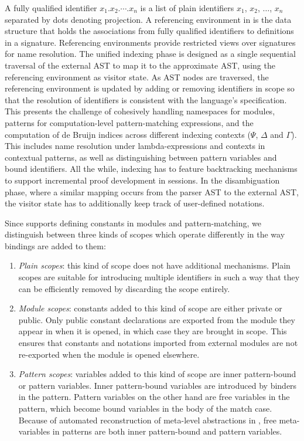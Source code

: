 A fully qualified identifier $x_1.x_2.\cdots.x_n$ is a list of plain identifiers $x_1$, $x_2$, $\dots$, $x_n$ separated by dots denoting projection.
A referencing environment in \Beluga is the data structure that holds the associations from fully qualified identifiers to definitions in a signature.
Referencing environments provide restricted views over signatures for name resolution.
The unified indexing phase is designed as a single sequential traversal of the external \ac{AST} to map it to the approximate \ac{AST}, using the referencing environment as visitor state.
As \ac{AST} nodes are traversed, the referencing environment is updated by adding or removing identifiers in scope so that the resolution of identifiers is consistent with the language's specification.
This presents the challenge of cohesively handling namespaces for modules, patterns for computation-level pattern-matching expressions, and the computation of de Bruijn indices across different indexing contexts ($\Psi$, $\Delta$ and $\Gamma$).
This includes name resolution under lambda-expressions and contexts in contextual \LF patterns, as well as distinguishing between pattern variables and bound identifiers.
All the while, indexing has to feature backtracking mechanisms to support incremental proof development in \Harpoon sessions.
In the disambiguation phase, where a similar mapping occurs from the parser \ac{AST} to the external \ac{AST}, the visitor state has to additionally keep track of user-defined notations.

Since \Beluga supports defining constants in modules and pattern-matching, we distinguish between three kinds of scopes which operate differently in the way bindings are added to them:
\begin{enumerate}
\item
\textit{Plain scopes}: this kind of scope does not have additional mechanisms.
Plain scopes are suitable for introducing multiple identifiers in such a way that they can be efficiently removed by discarding the scope entirely.
\item
\textit{Module scopes}: constants added to this kind of scope are either private or public.
Only public constant declarations are exported from the module they appear in when it is opened, in which case they are brought in scope.
This ensures that constants and notations imported from external modules are not re-exported when the module is opened elsewhere.
\item
\textit{Pattern scopes}: variables added to this kind of scope are inner pattern-bound or pattern variables.
Inner pattern-bound variables are introduced by binders in the pattern.
Pattern variables on the other hand are free variables in the pattern, which become bound variables in the body of the match case.
Because of automated reconstruction of meta-level abstractions in \Beluga, free meta-variables in patterns are both inner pattern-bound and pattern variables.
\end{enumerate}

